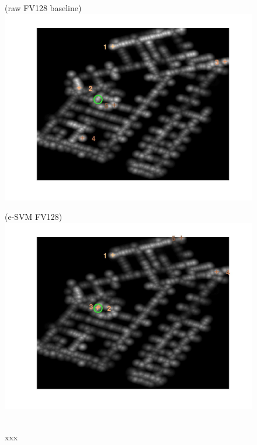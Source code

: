 \documentclass[10pt,onecolumn,A4]{article}
\begin{document}
\begin{figure}
	\begin{minipage}{0.45\linewidth}
		\center
		(raw FV128 baseline) \\
		\includegraphics[trim = 55mm 40mm 55mm 25mm, clip=true,width=\linewidth]{sup2959/heatRaw.jpg}
	\end{minipage} 
	\begin{minipage}{0.45\linewidth}
		\center
		(e-SVM FV128) \\
		\includegraphics[trim = 55mm 40mm 55mm 25mm, clip=true,width=\linewidth]{sup2959/heatSvm.jpg}
	\end{minipage} 
	\\
	\textcolor{myWhite}{xxx}\\

\end{figure}
\end{document}
